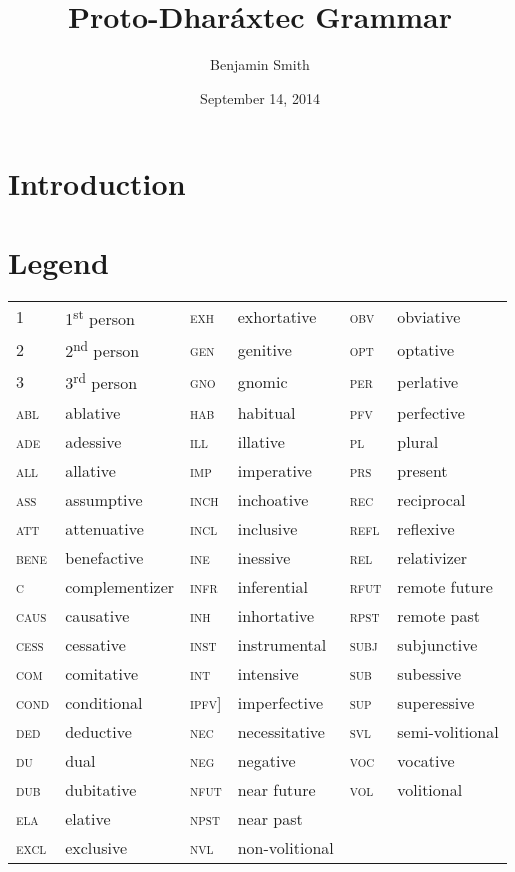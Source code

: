 \documentclass[11pt,a4paper,titlepage]{article}
\author{Benjamin Smith}
\title{Proto-Dharáxtec Grammar}
\date{September 14, 2014}
\begin{document}

	\tableofcontents

	\newpage

	\section{Introduction}

	\section{Legend}
		\begin{tabular}{l l l l l l}
			1 & 1\textsuperscript{st} person & \textsc{exh} & exhortative & \textsc{obv} & obviative \\
			2 & 2\textsuperscript{nd} person & \textsc{gen} & genitive & \textsc{opt} & optative \\
			3 & 3\textsuperscript{rd} person & \textsc{gno} & gnomic & \textsc{per} & perlative \\
			\textsc{abl} & ablative & \textsc{hab} & habitual & \textsc{pfv} & perfective \\
			\textsc{ade} & adessive & \textsc{ill} & illative & \textsc{pl} & plural \\
			\textsc{all} & allative & \textsc{imp} & imperative & \textsc{prs} & present \\
			\textsc{ass} & assumptive & \textsc{inch} & inchoative & \textsc{rec} & reciprocal \\
			\textsc{att} & attenuative & \textsc{incl} & inclusive & \textsc{refl} & reflexive \\
			\textsc{bene} & benefactive & \textsc{ine} & inessive & \textsc{rel} & relativizer \\
			\textsc{c} & complementizer & \textsc{infr} & inferential & \textsc{rfut} & remote future \\
			\textsc{caus} & causative & \textsc{inh} & inhortative & \textsc{rpst} & remote past \\
			\textsc{cess} & cessative & \textsc{inst} & instrumental & \textsc{subj} & subjunctive \\
			\textsc{com} & comitative & \textsc{int} & intensive & \textsc{sub} & subessive \\
			\textsc{cond} & conditional & \textsc{ipfv]} & imperfective & \textsc{sup} & superessive \\
			\textsc{ded} & deductive & \textsc{nec} & necessitative & \textsc{svl} & semi-volitional \\
			\textsc{du} & dual & \textsc{neg} & negative & \textsc{voc} & vocative \\
			\textsc{dub} & dubitative & \textsc{nfut} & near future & \textsc{vol} & volitional \\
			\textsc{ela} & elative & \textsc{npst} & near past & & \\
			\textsc{excl} & exclusive & \textsc{nvl} & non-volitional & & \\
		\end{tabular}
\end{document}
